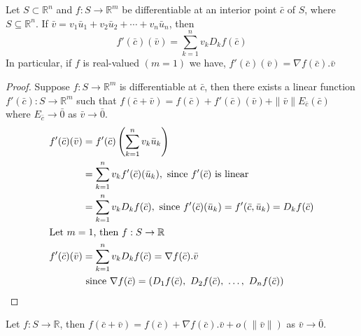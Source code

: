 \begin{theorem}
Let $S \subset \mathbb{R}^n$ and $f : S \to \mathbb{R}^m$ be differentiable at an interior point $\bar{c}$ of $S$, where $S \subseteq \mathbb{R}^n$.
If $\bar{v} = v_1\bar{u}_1+v_2\bar{u}_2 + \dotsb + v_n\bar{u}_n$, then
\[ f'(\bar{c})(\bar{v}) = \sum_{k=1}^n v_k D_k f(\bar{c}) \]
In particular, if $f$ is real-valued $(m = 1)$ we have, $f'(\bar{c})(\bar{v}) = \nabla{}f(\bar{c}).\bar{v}$
\end{theorem}
\begin{proof}
Suppose $f : S \to \mathbb{R}^m$ is differentiable at $\bar{c}$, then there exists a linear function $f'(\bar{c}) : S \to \mathbb{R}^m$ such that $f(\bar{c}+\bar{v}) = f(\bar{c}) + f'(\bar{c})(\bar{v}) + \|\bar{v}\| E_{\bar{c}}(\bar{c})$ where $E_{\bar{c}} \to \bar{0}$ as $\bar{v} \to \bar{0}$.
\begin{align*}
	f'(\bar{c})(\bar{v}) & = f'(\bar{c})\left(\sum_{k=1}^n v_k \bar{u}_k\right)\\
	& = \sum_{k=1}^n v_k f'(\bar{c})(\bar{u}_k), \text{ since $f'(\bar{c})$ is linear}\\
	& = \sum_{k=1}^n v_k D_k f(\bar{c}), \text{ since $f'(\bar{c})(\bar{u}_k) = f'(\bar{c},\bar{u}_k) = D_k f(\bar{c})$}\\
	\intertext{Let $m = 1$, then $f : S \to \mathbb{R}$ }
	f'(\bar{c})(\bar{v}) & = \sum_{k=1}^n v_k D_k f(\bar{c}) = \nabla{}f(\bar{c}).\bar{v}\\
	& \text{ since } \nabla{}f(\bar{c}) = \left( D_1f(\bar{c}),\ D_2f(\bar{c}),\ \dots ,\ D_nf(\bar{c}) \right)
\end{align*}
\end{proof}

\begin{remark}
Let $f : S \to \mathbb{R}$, then $f(\bar{c} +\bar{v}) = f (\bar{c}) + \nabla{}f(\bar{c}).\bar{v} + o(\|\bar{v}\|)$ as $\bar{v} \to \bar{0}$.
\end{remark}

\begin{remark}
\end{remark}

